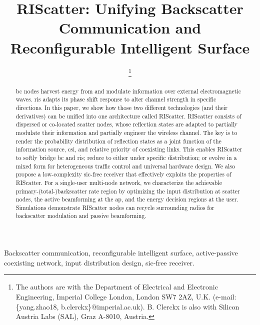 \documentclass[journal]{IEEEtran}
\begin{document}
\title{RIScatter: Unifying Backscatter Communication and Reconfigurable Intelligent Surface}
\author{
	\thanks{
		The authors are with the Department of Electrical and Electronic Engineering, Imperial College London, London SW7 2AZ, U.K. (e-mail: \{yang.zhao18, b.clerckx\}@imperial.ac.uk).
		B. Clerckx is also with Silicon Austria Labs (SAL), Graz A-8010, Austria.
	}
}
\maketitle

\begin{abstract}
	\gls{bc} nodes harvest energy from and modulate information over external electromagnetic waves.
	\gls{ris} adapts its phase shift response to alter channel strength in specific directions.
	In this paper, we show how those two different technologies (and their derivatives) can be unified into one architecture called RIScatter.
	RIScatter consists of dispersed or co-located scatter nodes, whose reflection states are adapted to partially modulate their information and partially engineer the wireless channel.
	The key is to render the probability distribution of reflection states as a joint function of the information source, \gls{csi}, and relative priority of coexisting links.
	This enables RIScatter to softly bridge \gls{bc} and \gls{ris}; reduce to either under specific distribution; or evolve in a mixed form for heterogeneous traffic control and universal hardware design.
	We also propose a low-complexity \gls{sic}-free receiver that effectively exploits the properties of RIScatter.
	For a single-user multi-node network, we characterize the achievable primary-(total-)backscatter rate region by optimizing the input distribution at scatter nodes, the active beamforming at the \gls{ap}, and the energy decision regions at the user.
	Simulations demonstrate RIScatter nodes can recycle surrounding radios for backscatter modulation and passive beamforming.
\end{abstract}

\begin{IEEEkeywords}
	Backscatter communication, reconfigurable intelligent surface, active-passive coexisting network, input distribution design, \gls{sic}-free receiver.
\end{IEEEkeywords}

\glsresetall
\end{document}
